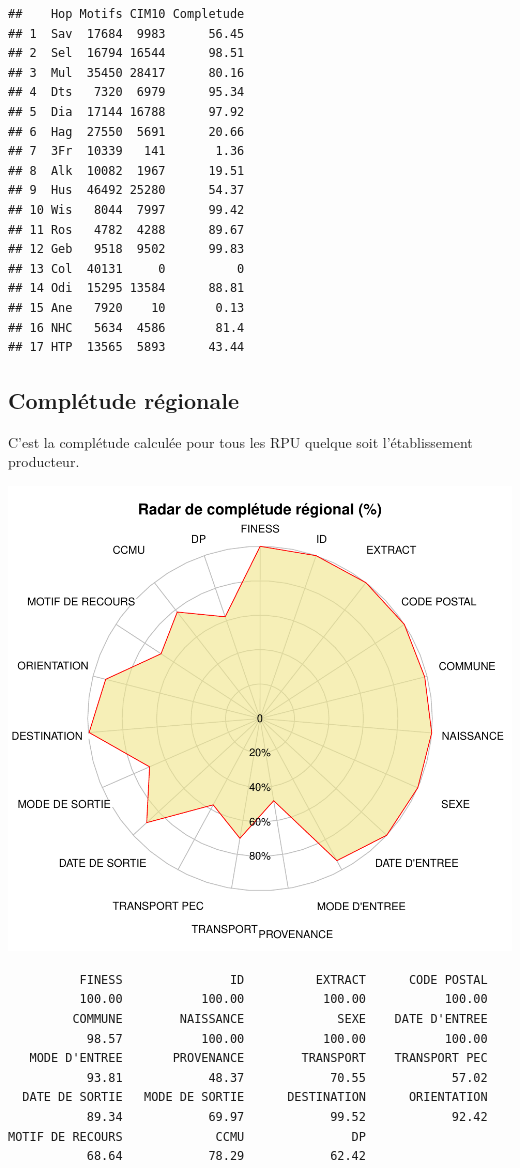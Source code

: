 \documentclass[]{article}
\begin{document}
\begin{verbatim}
##    Hop Motifs CIM10 Completude
## 1  Sav  17684  9983      56.45
## 2  Sel  16794 16544      98.51
## 3  Mul  35450 28417      80.16
## 4  Dts   7320  6979      95.34
## 5  Dia  17144 16788      97.92
## 6  Hag  27550  5691      20.66
## 7  3Fr  10339   141       1.36
## 8  Alk  10082  1967      19.51
## 9  Hus  46492 25280      54.37
## 10 Wis   8044  7997      99.42
## 11 Ros   4782  4288      89.67
## 12 Geb   9518  9502      99.83
## 13 Col  40131     0          0
## 14 Odi  15295 13584      88.81
## 15 Ane   7920    10       0.13
## 16 NHC   5634  4586       81.4
## 17 HTP  13565  5893      43.44
\end{verbatim}

\subsection{Complétude régionale}\label{completude-regionale}

C'est la complétude calculée pour tous les RPU quelque soit
l'établissement producteur.

\includegraphics{completude_files/figure-latex/comp_regionale-1.pdf}

\begin{verbatim}
          FINESS               ID          EXTRACT      CODE POSTAL 
          100.00           100.00           100.00           100.00 
         COMMUNE        NAISSANCE             SEXE    DATE D'ENTREE 
           98.57           100.00           100.00           100.00 
   MODE D'ENTREE       PROVENANCE        TRANSPORT    TRANSPORT PEC 
           93.81            48.37            70.55            57.02 
  DATE DE SORTIE   MODE DE SORTIE      DESTINATION      ORIENTATION 
           89.34            69.97            99.52            92.42 
MOTIF DE RECOURS             CCMU               DP 
           68.64            78.29            62.42 
\end{verbatim}
\end{document}
